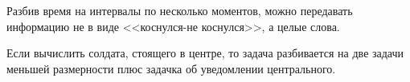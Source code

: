 \begin{solution}{6.57}

\end{solution}
\begin{solution}{6.58}

\end{solution}
\begin{solution}{6.59}

\end{solution}
\begin{solution}{6.60}

Разбив время на интервалы по несколько моментов, можно передавать информацию не в виде <<коснулся-не коснулся>>, а целые слова.\par
Если вычислить солдата, стоящего в центре, то задача разбивается на две задачи меньшей размерности плюс задачка об уведомлении центрального.
\end{solution}
\begin{solution}{6.61}

\end{solution}
\begin{solution}{6.62}

\end{solution}
\begin{solution}{6.63}

\end{solution}
\begin{solution}{6.64}

\end{solution}
\begin{solution}{6.65}

\end{solution}
\begin{solution}{6.66}

\end{solution}
\begin{solution}{6.67}

\end{solution}
\begin{solution}{6.68}

\end{solution}
\begin{solution}{6.69}
 
\end{solution}
\begin{solution}{6.70}
 
\end{solution}
\begin{solution}{6.71}

\end{solution}
